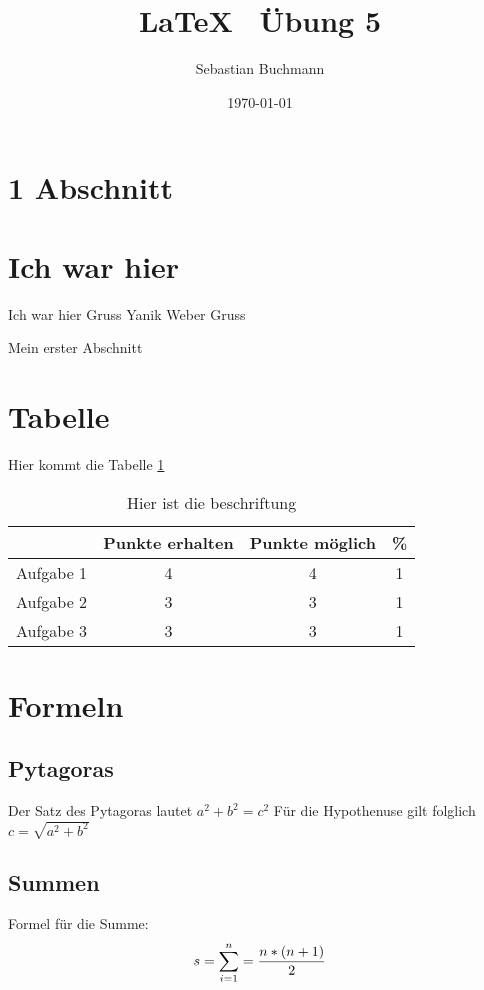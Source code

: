 \documentclass[11pt,a4paper]{article}
\date{\today}
\author{Sebastian Buchmann}
\title{ \LaTeX ~ Übung 5}
\begin{document}
\maketitle
\section{1 Abschnitt}
\section{Ich war hier}

Ich war hier Gruss Yanik Weber Gruss


Mein erster Abschnitt


\section{Tabelle}
Hier kommt die Tabelle \ref{tab:Punkte}
\begin{table} [h]
\centering
\begin{tabular} {c|c|c|c} 

{} & {Punkte erhalten}  & {Punkte möglich} & {\%}   \\
\hline

Aufgabe 1 & 4 & 4 & 1 \\
Aufgabe 2 & 3 & 3 & 1 \\
Aufgabe 3 & 3 & 3 & 1 \\


\end{tabular}

\caption{Hier ist die beschriftung}
\label{tab:Punkte}
\end{table}
\section{Formeln}

\subsection{Pytagoras}
 Der Satz des Pytagoras lautet $ a^2 + b^2 = c^2$ Für die Hypothenuse gilt folglich $c = \sqrt{a^2+b^2}$
 
\subsection{Summen}

Formel für die Summe: \\
\begin{equation}
 s= \sum\limits_{i=1}^{n} = \frac{n*(n+1)}{2}   
\centering
\end{equation}
\end{document}
